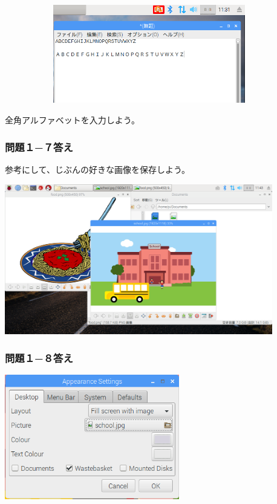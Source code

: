 \documentclass[a4paper,12pt]{jarticle}
\begin{document}
\bigskip

\bigskip


\centering
\includegraphics[width=12.631cm,height=4.297cm]{textbook-img220.png}
\flushleft

\bigskip

全角アルファベットを入力しよう。
\clearpage

\subsubsection{\bfseries
  問題１−７答え}

参考にして、じぶんの好きな画像を保存しよう。

\centering
\includegraphics[width=11.705cm,height=6.581cm]{textbook-img221.png}
\flushleft

\bigskip


\subsubsection{\bfseries
  問題１−８答え}



\centering
\includegraphics[width=7.631cm,height=5.44cm]{textbook-img222.png}
\end{document}
